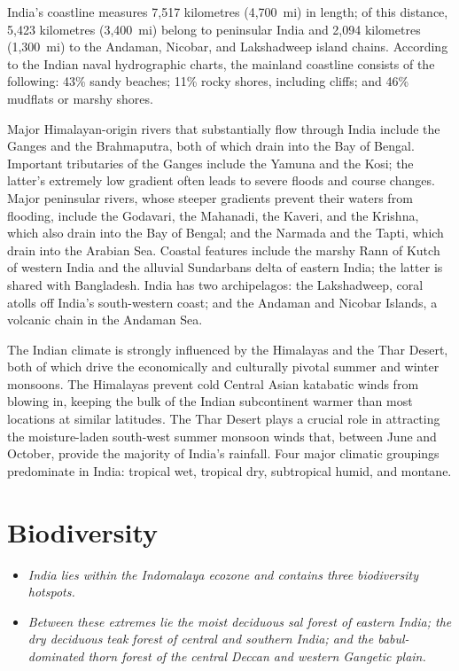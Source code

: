 India's coastline measures 7,517 kilometres (4,700~mi) in length; of
this distance, 5,423 kilometres (3,400~mi) belong to peninsular India
and 2,094 kilometres (1,300~mi) to the Andaman, Nicobar, and Lakshadweep
island chains. According to the Indian naval hydrographic charts, the
mainland coastline consists of the following: 43\% sandy beaches; 11\%
rocky shores, including cliffs; and 46\% mudflats or marshy shores.

Major Himalayan-origin rivers that substantially flow through India
include the Ganges and the Brahmaputra, both of which drain into the Bay
of Bengal. Important tributaries of the Ganges include the Yamuna and
the Kosi; the latter's extremely low gradient often leads to severe
floods and course changes. Major peninsular rivers, whose steeper
gradients prevent their waters from flooding, include the Godavari, the
Mahanadi, the Kaveri, and the Krishna, which also drain into the Bay of
Bengal; and the Narmada and the Tapti, which drain into the Arabian Sea.
Coastal features include the marshy Rann of Kutch of western India and
the alluvial Sundarbans delta of eastern India; the latter is shared
with Bangladesh. India has two archipelagos: the Lakshadweep, coral
atolls off India's south-western coast; and the Andaman and Nicobar
Islands, a volcanic chain in the Andaman Sea.

The Indian climate is strongly influenced by the Himalayas and the Thar
Desert, both of which drive the economically and culturally pivotal
summer and winter monsoons. The Himalayas prevent cold Central Asian
katabatic winds from blowing in, keeping the bulk of the Indian
subcontinent warmer than most locations at similar latitudes. The Thar
Desert plays a crucial role in attracting the moisture-laden south-west
summer monsoon winds that, between June and October, provide the
majority of India's rainfall. Four major climatic groupings predominate
in India: tropical wet, tropical dry, subtropical humid, and montane.

\section{Biodiversity}\label{biodiversity}

\begin{itemize}
\item
  \emph{India lies within the Indomalaya ecozone and contains three
  biodiversity hotspots.}
\item
  \emph{Between these extremes lie the moist deciduous sal forest of
  eastern India; the dry deciduous teak forest of central and southern
  India; and the babul-dominated thorn forest of the central Deccan and
  western Gangetic plain.}
\end{itemize}

